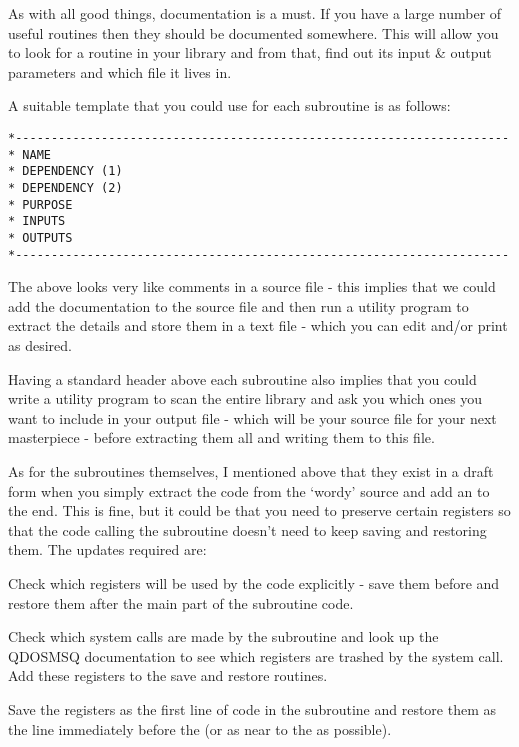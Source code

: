 As with all good things, documentation is a must. If you have a
    large number of useful routines then they should be documented somewhere.
    This will allow you to look for a routine in your library and from that,
    find out its input \& output parameters and which file it lives
    in.

A suitable template that you could use for each subroutine is as
    follows:

\begin{lstlisting}[firstnumber=1,frame=none,numbers=none]
*---------------------------------------------------------------------
* NAME
* DEPENDENCY (1)
* DEPENDENCY (2)
* PURPOSE
* INPUTS
* OUTPUTS
*---------------------------------------------------------------------
\end{lstlisting}

The above looks very like comments in a source file -{} this implies
    that we could add the documentation to the source file and then run a
    utility program to extract the details and store them in a text file -{}
    which you can edit and/or print as desired.

Having a standard header above each subroutine also implies that you
    could write a utility program to scan the entire library and ask you which
    ones you want to include in your output file -{} which will be your source
    file for your next masterpiece -{} before extracting them all and writing
    them to this file.

As for the subroutines themselves, I mentioned above that they exist
    in a draft form when you simply extract the code from the `wordy' source
    and add an  to the end. This is fine, but it could be that you need to
    preserve certain registers so that the code calling the subroutine doesn't
    need to keep saving and restoring them. The updates required are:

Check which registers will be used by the code explicitly -{} save
    them before and restore them after the main part of the subroutine
    code.

Check which system calls are made by the subroutine and look up the
    QDOSMSQ documentation to see which registers are trashed by the system
    call. Add these registers to the save and restore routines.

Save the registers as the first line of code in the subroutine and
    restore them as the line immediately before the  (or as near to the  as possible).

